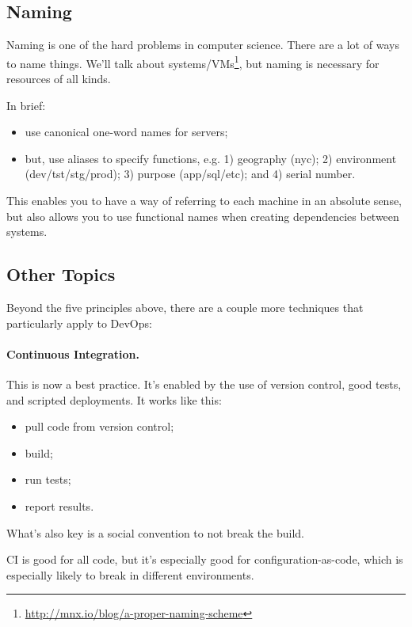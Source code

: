 \documentclass[11pt]{article}
\newenvironment{itemizep}{
 \begin{itemize}
  \setlength{\itemsep}{0pt}
  \setlength{\parsep}{3pt}
  \setlength{\topsep}{3pt}
  \setlength{\partopsep}{0pt}
  \setlength{\leftmargin}{1.5em}
  \setlength{\labelwidth}{1em}
  \setlength{\labelsep}{0.5em} }
 {\end{itemize}}
\begin{document}
\subsection*{Naming}
Naming is one of the hard problems in computer science. There are a
lot of ways to name things. We'll talk about
systems/VMs\footnote{\url{http://mnx.io/blog/a-proper-naming-scheme}},
but naming is necessary for resources of all kinds.

In brief:
\begin{itemizep}
\item use canonical one-word names for servers;
\item but, use aliases to specify functions, e.g. 1) geography (nyc); 2) environment (dev/tst/stg/prod); 
3) purpose (app/sql/etc); and 4) serial number.
\end{itemizep}
This enables you to have a way of referring to each machine in an absolute sense, but also 
allows you to use functional names when creating dependencies between systems.

\subsection*{Other Topics}
Beyond the five principles above, there are a couple more techniques that particularly apply to
DevOps:

\paragraph{Continuous Integration.} 
This is now a best practice. It's enabled by the use of version control, good tests, and scripted deployments.
It works like this:
\begin{itemizep}
\item pull code from version control;
\item build;
\item run tests;
\item report results.
\end{itemizep}
What's also key is a social convention to not break the build. 


CI is good for all code, but it's especially good for configuration-as-code, which is especially likely
to break in different environments.
\end{document}

